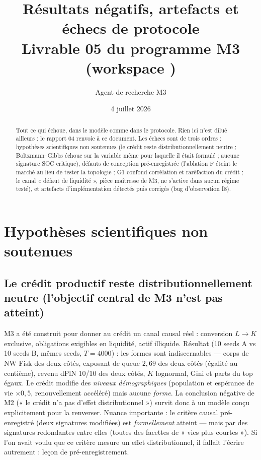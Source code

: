 \documentclass[11pt,a4paper]{article}
\title{Résultats négatifs, artefacts et échecs de protocole\\
\large Livrable 05 du programme M3 (workspace \code{m3\_credit\_soc})}
\author{Agent de recherche M3}
\date{4 juillet 2026}
\newcommand{\NW}{\mathrm{NW}}
\begin{document}
\maketitle

\begin{abstract}
Tout ce qui échoue, dans le modèle comme dans le protocole. Rien ici n'est
dilué ailleurs : le rapport 04 renvoie à ce document. Les échecs sont de
trois ordres : hypothèses scientifiques non soutenues (le crédit reste
distributionnellement neutre ; Boltzmann--Gibbs échoue sur la variable même
pour laquelle il était formulé ; aucune signature SOC critique), défauts de
conception pré-enregistrée (l'ablation F éteint le marché au lieu de tester
la topologie ; G1 confond corrélation et raréfaction du crédit ; le canal
« défaut de liquidité », pièce maîtresse de M3, ne s'active dans aucun
régime testé), et artefacts d'implémentation détectés puis corrigés (bug
d'observation I8).
\end{abstract}

\section{Hypothèses scientifiques non soutenues}

\subsection{Le crédit productif reste distributionnellement neutre
(l'objectif central de M3 n'est pas atteint)}
M3 a été construit pour donner au crédit un canal causal réel : conversion
$L \to K$ exclusive, obligations exigibles en liquidité, actif illiquide.
Résultat (10 seeds A vs 10 seeds B, mêmes seeds, $T{=}4000$) : les formes
sont indiscernables — corps de $\NW$ Fisk des deux côtés, exposant de queue
$2{,}69$ des deux côtés (égalité au centième), revenu dPlN 10/10 des deux
côtés, $K$ lognormal, Gini et parts du top égaux. Le crédit modifie des
\emph{niveaux démographiques} (population et espérance de vie $\times 0{,}5$,
renouvellement accéléré) mais aucune \emph{forme}. La conclusion négative de
M2 (« le crédit n'a pas d'effet distributionnel ») survit donc à un modèle
conçu explicitement pour la renverser. Nuance importante : le critère causal
pré-enregistré (deux signatures modifiées) est \emph{formellement} atteint —
mais par des signatures redondantes entre elles (toutes des facettes de
« vies plus courtes »). Si l'on avait voulu que ce critère mesure un effet
distributionnel, il fallait l'écrire autrement : leçon de pré-enregistrement.
\end{document}
